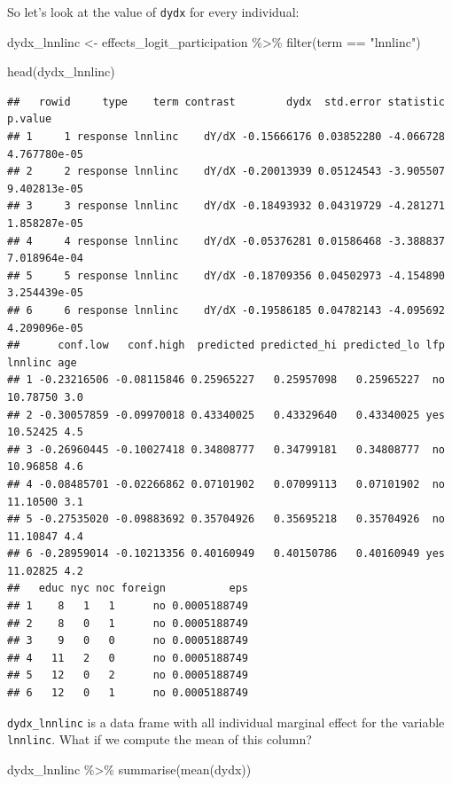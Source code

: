 \documentclass[
]{article}
\newenvironment{Shaded}{\begin{snugshade}}{\end{snugshade}}
\newcommand{\FunctionTok}[1]{\textcolor[rgb]{0.00,0.00,0.00}{#1}}
\newcommand{\NormalTok}[1]{#1}
\newcommand{\OtherTok}[1]{\textcolor[rgb]{0.56,0.35,0.01}{#1}}
\newcommand{\SpecialCharTok}[1]{\textcolor[rgb]{0.00,0.00,0.00}{#1}}
\newcommand{\StringTok}[1]{\textcolor[rgb]{0.31,0.60,0.02}{#1}}
\begin{document}
So let's look at the value of \texttt{dydx} for every individual:

\begin{Shaded}
\begin{Highlighting}[]
\NormalTok{dydx\_lnnlinc }\OtherTok{\textless{}{-}}\NormalTok{ effects\_logit\_participation }\SpecialCharTok{\%\textgreater{}\%}
  \FunctionTok{filter}\NormalTok{(term }\SpecialCharTok{==} \StringTok{"lnnlinc"}\NormalTok{)}

\FunctionTok{head}\NormalTok{(dydx\_lnnlinc)}
\end{Highlighting}
\end{Shaded}

\begin{verbatim}
##   rowid     type    term contrast        dydx  std.error statistic      p.value
## 1     1 response lnnlinc    dY/dX -0.15666176 0.03852280 -4.066728 4.767780e-05
## 2     2 response lnnlinc    dY/dX -0.20013939 0.05124543 -3.905507 9.402813e-05
## 3     3 response lnnlinc    dY/dX -0.18493932 0.04319729 -4.281271 1.858287e-05
## 4     4 response lnnlinc    dY/dX -0.05376281 0.01586468 -3.388837 7.018964e-04
## 5     5 response lnnlinc    dY/dX -0.18709356 0.04502973 -4.154890 3.254439e-05
## 6     6 response lnnlinc    dY/dX -0.19586185 0.04782143 -4.095692 4.209096e-05
##      conf.low   conf.high  predicted predicted_hi predicted_lo lfp  lnnlinc age
## 1 -0.23216506 -0.08115846 0.25965227   0.25957098   0.25965227  no 10.78750 3.0
## 2 -0.30057859 -0.09970018 0.43340025   0.43329640   0.43340025 yes 10.52425 4.5
## 3 -0.26960445 -0.10027418 0.34808777   0.34799181   0.34808777  no 10.96858 4.6
## 4 -0.08485701 -0.02266862 0.07101902   0.07099113   0.07101902  no 11.10500 3.1
## 5 -0.27535020 -0.09883692 0.35704926   0.35695218   0.35704926  no 11.10847 4.4
## 6 -0.28959014 -0.10213356 0.40160949   0.40150786   0.40160949 yes 11.02825 4.2
##   educ nyc noc foreign          eps
## 1    8   1   1      no 0.0005188749
## 2    8   0   1      no 0.0005188749
## 3    9   0   0      no 0.0005188749
## 4   11   2   0      no 0.0005188749
## 5   12   0   2      no 0.0005188749
## 6   12   0   1      no 0.0005188749
\end{verbatim}

\texttt{dydx\_lnnlinc} is a data frame with all individual marginal effect for the variable \texttt{lnnlinc}.
What if we compute the mean of this column?

\begin{Shaded}
\begin{Highlighting}[]
\NormalTok{dydx\_lnnlinc }\SpecialCharTok{\%\textgreater{}\%}
  \FunctionTok{summarise}\NormalTok{(}\FunctionTok{mean}\NormalTok{(dydx))}
\end{Highlighting}
\end{Shaded}
\end{document}
